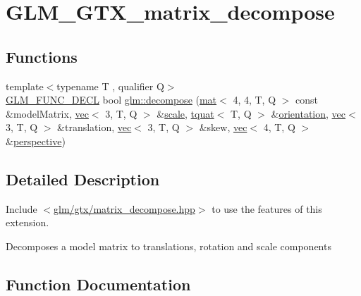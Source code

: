 \hypertarget{group__gtx__matrix__decompose}{}\section{G\+L\+M\+\_\+\+G\+T\+X\+\_\+matrix\+\_\+decompose}
\label{group__gtx__matrix__decompose}
\subsection*{Functions}
\begin{DoxyCompactItemize}
\item 
{\footnotesize template$<$typename T , qualifier Q$>$ }\\\mbox{\hyperlink{setup_8hpp_ab2d052de21a70539923e9bcbf6e83a51}{G\+L\+M\+\_\+\+F\+U\+N\+C\+\_\+\+D\+E\+CL}} bool \mbox{\hyperlink{group__gtx__matrix__decompose_ga91185463739c855d602596907a9994bc}{glm\+::decompose}} (\mbox{\hyperlink{structglm_1_1mat}{mat}}$<$ 4, 4, T, Q $>$ const \&model\+Matrix, \mbox{\hyperlink{structglm_1_1vec}{vec}}$<$ 3, T, Q $>$ \&\mbox{\hyperlink{_s_d_l__opengl__glext_8h_a281421b881aa7a1266842b73a3bc7655}{scale}}, \mbox{\hyperlink{structglm_1_1tquat}{tquat}}$<$ T, Q $>$ \&\mbox{\hyperlink{group__gtx__rotate__vector_ga1a32fceb71962e6160e8af295c91930a}{orientation}}, \mbox{\hyperlink{structglm_1_1vec}{vec}}$<$ 3, T, Q $>$ \&translation, \mbox{\hyperlink{structglm_1_1vec}{vec}}$<$ 3, T, Q $>$ \&skew, \mbox{\hyperlink{structglm_1_1vec}{vec}}$<$ 4, T, Q $>$ \&\mbox{\hyperlink{group__gtc__matrix__transform_ga747c8cf99458663dd7ad1bb3a2f07787}{perspective}})
\end{DoxyCompactItemize}


\subsection{Detailed Description}
Include $<$\mbox{\hyperlink{matrix__decompose_8hpp}{glm/gtx/matrix\+\_\+decompose.\+hpp}}$>$ to use the features of this extension.

Decomposes a model matrix to translations, rotation and scale components 

\subsection{Function Documentation}
\mbox{\label{group__gtx__matrix__decompose_ga91185463739c855d602596907a9994bc}} 
